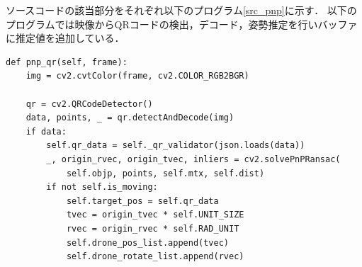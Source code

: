 ソースコードの該当部分をそれぞれ以下のプログラム\ref{src_pnp}に示す．
以下のプログラムでは映像からQRコードの検出，デコード，姿勢推定を行いバッファに推定値を追加している．
\begin{lstlisting}[caption=pnp method,label=src_pnp]
def pnp_qr(self, frame):                                                                                                                                     
    img = cv2.cvtColor(frame, cv2.COLOR_RGB2BGR)                                                                                                             
                                                                                                                                                             
    qr = cv2.QRCodeDetector()                                                                                                                                
    data, points, _ = qr.detectAndDecode(img)                                                                                                                
    if data:                                                                                                                                                 
        self.qr_data = self._qr_validator(json.loads(data))                                                                                                  
        _, origin_rvec, origin_tvec, inliers = cv2.solvePnPRansac(                                                                                           
            self.objp, points, self.mtx, self.dist)                                                                                                          
        if not self.is_moving:                                                                                                                               
            self.target_pos = self.qr_data                                                                                                                   
            tvec = origin_tvec * self.UNIT_SIZE                                                                                                              
            rvec = origin_rvec * self.RAD_UNIT                                                                                                               
            self.drone_pos_list.append(tvec)                                                                                                                 
            self.drone_rotate_list.append(rvec)                                                                                                              

\end{lstlisting}
